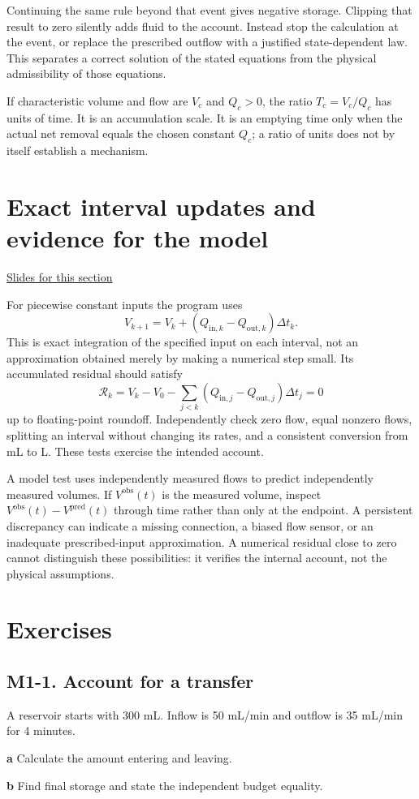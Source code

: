 \documentclass[11pt,letterpaper]{article}
\theoremstyle{definition}\newtheorem{definition}{Definition}\newtheorem{example}{Example}
\numberwithin{equation}{section}
\begin{document}
Continuing the same rule beyond that event gives negative storage. Clipping that result to zero silently adds fluid to the account. Instead stop the calculation at the event, or replace the prescribed outflow with a justified state-dependent law. This separates a correct solution of the stated equations from the physical admissibility of those equations.

If characteristic volume and flow are $V_c$ and $Q_c>0$, the ratio $T_c=V_c/Q_c$ has units of time. It is an accumulation scale. It is an emptying time only when the actual net removal equals the chosen constant $Q_c$; a ratio of units does not by itself establish a mechanism.
\section{Exact interval updates and evidence for the model}
\hypertarget{note-exact-interval-updates-and-evidence-for-the-model}{}\label{note:exact-interval-updates-and-evidence-for-the-model}
{\small \href{slides.html\#frame=an-exact-interval-algorithm\&step=1}{Slides for this section}}\par
For piecewise constant inputs the program uses
\[
V_{k+1}=V_k+(Q_{\mathrm{in},k}-Q_{\mathrm{out},k})\Delta t_k.
\]
This is exact integration of the specified input on each interval, not an approximation obtained merely by making a numerical step small. Its accumulated residual should satisfy
\[
\mathcal R_k=V_k-V_0-
\sum_{j<k}(Q_{\mathrm{in},j}-Q_{\mathrm{out},j})\Delta t_j=0
\]
up to floating-point roundoff. Independently check zero flow, equal nonzero flows, splitting an interval without changing its rates, and a consistent conversion from mL to L. These tests exercise the intended account.

A model test uses independently measured flows to predict independently measured volumes. If $V^{\mathrm{obs}}(t)$ is the measured volume, inspect $V^{\mathrm{obs}}(t)-V^{\mathrm{pred}}(t)$ through time rather than only at the endpoint. A persistent discrepancy can indicate a missing connection, a biased flow sensor, or an inadequate prescribed-input approximation. A numerical residual close to zero cannot distinguish these possibilities: it verifies the internal account, not the physical assumptions.
\bigskip
\section*{Exercises}
\par\noindent\begin{minipage}{\linewidth}
\subsection*{M1-1. Account for a transfer}
A reservoir starts with 300 mL. Inflow is 50 mL/min and outflow is 35 mL/min for 4 minutes.

\textbf{a} Calculate the amount entering and leaving.

\end{minipage}\par\medskip
\textbf{b} Find final storage and state the independent budget equality.
\end{document}
